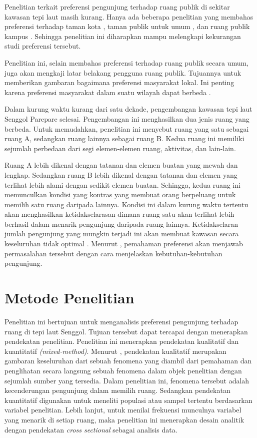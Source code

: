 \documentclass[11pt]{udthesis} %
\begin{document}
Penelitian terkait preferensi pengunjung terhadap ruang publik di sekitar kawasan tepi laut masih kurang. Hanya ada beberapa penelitian yang membahas preferensi terhadap taman kota \citep{alves2008,devysandra2012,dwiputra2017,madureira2018}, taman publik untuk umum  \citep{grilli2020}, dan ruang publik kampus \citep{zhang2006}. Sehingga penelitian ini diharapkan mampu melengkapi kekurangan studi preferensi tersebut.

Penelitian ini, selain membahas preferensi terhadap ruang publik secara umum, juga akan mengkaji latar belakang pengguna ruang publik. Tujuannya untuk memberikan gambaran bagaimana preferensi masyarakat lokal. Ini penting karena preferensi masyarakat dalam suatu wilayah dapat berbeda \citep{madureira2018}.

Dalam kurung waktu kurang dari satu dekade, pengembangan kawasan tepi laut Senggol Parepare selesai. Pengembangan ini menghasilkan dua jenis ruang yang berbeda. Untuk memudahkan, penelitian ini menyebut ruang yang satu sebagai ruang A, sedangkan ruang lainnya sebagai ruang B. Kedua ruang ini memiliki sejumlah perbedaan dari segi elemen-elemen ruang, aktivitas, dan lain-lain.

Ruang A lebih dikenal dengan tatanan dan elemen buatan yang mewah dan lengkap. Sedangkan ruang B lebih dikenal dengan tatanan dan elemen yang terlihat lebih alami dengan sedikit elemen buatan. Sehingga, kedua ruang ini memunculkan kondisi yang kontras yang membuat orang berpeluang untuk memilih satu ruang daripada lainnya. Kondisi ini dalam kurung waktu tertentu akan menghasilkan ketidakselarasan dimana ruang satu akan terlihat lebih berhasil dalam menarik pengunjung daripada ruang lainnya. Ketidakselaran jumlah pengunjung yang mungkin terjadi ini akan membuat kawasan secara keseluruhan tidak optimal \citep{sari2015}. Menurut \cite{madureira2018}, pemahaman preferensi akan menjawab permasalahan tersebut dengan cara menjelaskan kebutuhan-kebutuhan pengunjung.



\section{Metode Penelitian}
\label{sub:metpen}

Penelitian ini bertujuan untuk menganalisis preferensi pengunjung terhadap ruang di tepi laut Senggol. Tujuan tersebut dapat tercapai dengan menerapkan pendekatan penelitian. Penelitian ini menerapkan pendekatan kualitatif dan kuantitatif \textit{(mixed-method)}. Menurut \cite{creswell2016}, pendekatan kualitatif merupakan gambaran keseluruhan dari sebuah fenomena yang diambil dari pemahaman dan penglihatan secara langsung sebuah fenomena dalam objek penelitian dengan sejumlah sumber yang tersedia. Dalam penelitian ini, fenomena tersebut adalah kecenderungan pengunjung dalam memilih ruang. Sedangkan pendekatan kuantitatif digunakan untuk meneliti populasi atau sampel tertentu berdasarkan variabel penelitian. Lebih lanjut, untuk menilai frekuensi munculnya variabel yang menarik di setiap ruang, maka penelitian ini menerapkan desain analitik dengan pendekatan \textit{cross sectional} sebagai analisis data.
\end{document}
